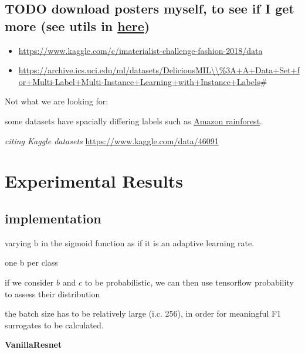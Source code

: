\documentclass[sigconf,natbib,screen=true,review=true,anonymous]{acmart}
\begin{document}
\subsection*{{\color{red}\bfseries\sffamily TODO} download posters myself, to see if I get more  (see utils in \href{https://github.com/ashrefm/multi-label-soft-f1.git}{here})}
\label{sec:org61b8dcf}
\begin{itemize}
\item \url{https://www.kaggle.com/c/imaterialist-challenge-fashion-2018/data}

\item \url{https://archive.ics.uci.edu/ml/datasets/DeliciousMIL\\\%3A+A+Data+Set+for+Multi-Label+Multi-Instance+Learning+with+Instance+Labels}\#
\end{itemize}


Not what we are looking for:

some datasets have spacially differing labels such as \href{https://machinelearningmastery.com/how-to-develop-a-convolutional-neural-network-to-classify-satellite-photos-of-the-amazon-rainforest/}{Amazon rainforest}.

\emph{citing Kaggle datasets}
\url{https://www.kaggle.com/data/46091}


\section{Experimental Results}
\label{sec:orgedae6c8}


\subsection{implementation}
\label{sec:org85e54b3}

varying b in the sigmoid function as if it is an adaptive learning rate.

one b per class

if we consider \(b\) and \(c\) to be probabilistic, we can then use tensorflow probability to assess their distribution

the batch size has to be relatively large (i.c. 256), in order for meaningful F1 surrogates to be calculated.



\textbf{VanillaResnet}
\end{document}
